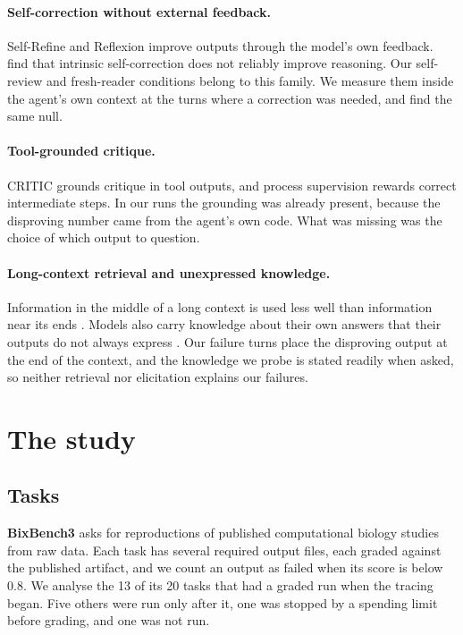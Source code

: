 \documentclass[10pt]{article}
\begin{document}
\paragraph{Self-correction without external feedback.} Self-Refine \citep{madaan2023selfrefine} and Reflexion
\citep{shinn2023reflexion} improve outputs through the model's own feedback. \citet{huang2024selfcorrect} find that intrinsic
self-correction does not reliably improve reasoning. Our self-review and fresh-reader conditions belong to this family. We measure
them inside the agent's own context at the turns where a correction was needed, and find the same null.

\paragraph{Tool-grounded critique.} CRITIC \citep{gou2024critic} grounds critique in tool outputs, and process supervision
\citep{lightman2023verify} rewards correct intermediate steps. In our runs the grounding was already present, because the disproving
number came from the agent's own code. What was missing was the choice of which output to question.

\paragraph{Long-context retrieval and unexpressed knowledge.} Information in the middle of a long context is used less well than
information near its ends \citep{liu2024lost}. Models also carry knowledge about their own answers that their outputs do not always
express \citep{kadavath2022language,burns2023latent,orgad2025know}. Our failure turns place the disproving output at the end of the
context, and the knowledge we probe is stated readily when asked, so neither retrieval nor elicitation explains our failures.

\section{The study}\label{sec:study}

\subsection{Tasks}
\textbf{BixBench3} \citep{koch2026bixbench3} asks for reproductions of published computational biology studies from raw data. Each
task has several required output files, each graded against the published artifact, and we count an output as failed when its
score is below 0.8. We analyse the 13 of its 20 tasks that had a graded run when the tracing began. Five others were run only after
it, one was stopped by a spending limit before grading, and one was not run.
\end{document}
